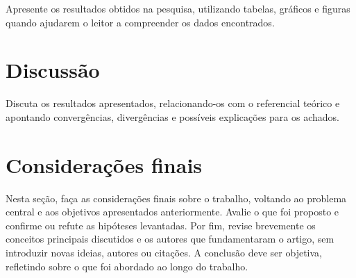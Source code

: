 \documentclass[
	article,
	12pt,
	oneside,
	a4paper,
	section=TITLE,
	english,
	brazil,
	sumario=tradicional
	]{abntex2}
\begin{document}
Apresente os resultados obtidos na pesquisa, utilizando tabelas, gráficos
e figuras quando ajudarem o leitor a compreender os dados encontrados.

\section{Discussão}

Discuta os resultados apresentados, relacionando-os com o referencial
teórico e apontando convergências, divergências e possíveis explicações
para os achados.

\section{Considerações finais}

Nesta seção, faça as considerações finais sobre o trabalho, voltando ao
problema central e aos objetivos apresentados anteriormente. Avalie o que
foi proposto e confirme ou refute as hipóteses levantadas. Por fim, revise
brevemente os conceitos principais discutidos e os autores que
fundamentaram o artigo, sem introduzir novas ideias, autores ou citações.
A conclusão deve ser objetiva, refletindo sobre o que foi abordado ao
longo do trabalho.

\postextual


\end{document}
